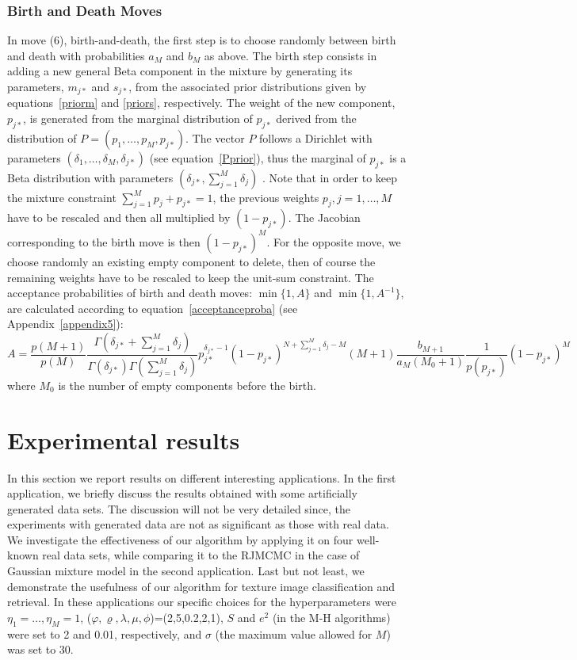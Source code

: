 \documentclass[journal,10pt]{elsart}
\begin{document}
\subsubsection{Birth and Death Moves}
In move (6), birth-and-death, the first step is to choose randomly between birth and death with probabilities $a_M$ and $b_M$ as above.
The birth step consists in adding a new general Beta component in the mixture by generating its parameters, $m_{j*}$ and $s_{j*}$, from the associated prior distributions given by equations~\ref{priorm} and \ref{priors}, respectively.
The weight of the new component, $p_{j*}$, is generated from the marginal distribution of $p_{j*}$ derived from the distribution of $P=(p_1,\ldots,p_M,p_{j*})$.
The vector $P$ follows a Dirichlet with parameters $(\delta_1,\ldots,\delta_{M},\delta_{j*})$ (see equation~\ref{Pprior}),
thus the marginal of $p_{j*}$ is a Beta distribution with parameters $(\delta_{j*},\sum_{j=1}^M \delta_j)$ \cite{Kotz1995}.
Note that in order to keep the mixture constraint $\sum_{j=1}^{M} p_j+p_{j*}=1$, the previous weights $p_j, j=1,\ldots,M$ have to be rescaled and then all multiplied by $(1-p_{j*})$.
The Jacobian corresponding to the birth move is then  $(1-p_{j*})^M$.
For the opposite move, we choose randomly an existing empty component to delete,
then of course the remaining weights have to be rescaled to keep the unit-sum constraint.
The acceptance probabilities of birth and death moves: $\min\{1, A\}$ and $\min\{1,A^{-1}\}$,
are calculated according to equation~\ref{acceptanceproba} (see Appendix~\ref{appendix5}):
\begin{equation}
A=\frac{p(M+1)}{p(M)}\frac{\Gamma(\delta_{j*}+\sum_{j=1}^{M}\delta_j)}{\Gamma(\delta_{j*})\Gamma(\sum_{j=1}^{M}\delta_j)}p_{j*}^{\delta_{j*}-1}(1-p_{j*})^{N+\sum_{j=1}^M\delta_j-M}(M+1)\frac{b_{M+1}}{a_M(M_0+1)}\frac{1}{p(p_{j*})}(1-p_{j*})^M
\end{equation}
where $M_0$ is the number of empty components before the birth.
\section{Experimental results}
In this section we report results on different interesting applications.
In the first application, we briefly discuss the results obtained with some artificially generated data sets.
The discussion will not be very detailed since, the experiments with generated data are not as significant as those with real data.
We investigate the effectiveness of our algorithm by applying it on four well-known real data sets,
while comparing it to the RJMCMC in the case of Gaussian mixture model \cite{Green1997} in the second application. Last but not least, we demonstrate the usefulness of our algorithm for texture image classification and retrieval.
In these applications our specific choices for the hyperparameters were $\eta_1=\ldots,\eta_M=1$, ($\varphi, \varrho, \lambda,\mu, \phi$)=(2,5,0.2,2,1),
$S$ and $e^2$ (in the M-H algorithms) were set to 2 and 0.01, respectively, and $\sigma$ (the maximum value allowed for $M$) was set to 30.
\end{document}
